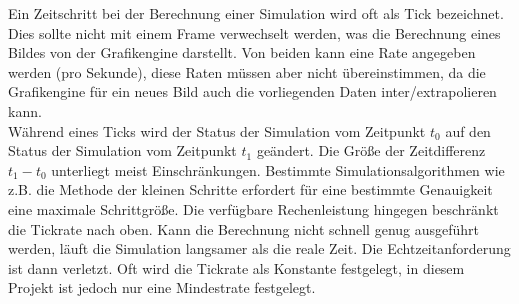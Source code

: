 

Ein Zeitschritt bei der Berechnung einer Simulation wird oft als Tick bezeichnet. Dies sollte nicht mit einem Frame verwechselt werden, was die Berechnung eines Bildes von der Grafikengine darstellt. Von beiden kann eine Rate angegeben werden (pro Sekunde), diese Raten müssen aber nicht übereinstimmen, da die Grafikengine für ein neues Bild auch die vorliegenden Daten inter/extrapolieren kann. \\
Während eines Ticks wird der Status der Simulation vom Zeitpunkt $t_0$ auf den Status der Simulation vom Zeitpunkt $t_1$ geändert. Die Größe der Zeitdifferenz $t_1 - t_0$ unterliegt meist Einschränkungen. Bestimmte Simulationsalgorithmen wie z.B. die Methode der kleinen Schritte erfordert für eine bestimmte Genauigkeit eine maximale Schrittgröße. Die verfügbare Rechenleistung hingegen beschränkt die Tickrate nach oben. Kann die Berechnung nicht schnell genug ausgeführt werden, läuft die Simulation langsamer als die reale Zeit. Die Echtzeitanforderung ist dann verletzt. Oft wird die Tickrate als Konstante festgelegt, in diesem Projekt ist jedoch nur eine Mindestrate festgelegt.
